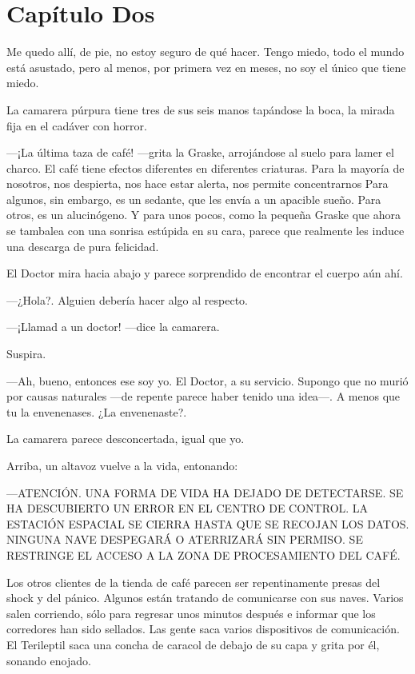 \chapter*{Capítulo Dos}


Me quedo allí, de pie, no estoy seguro de qué hacer. Tengo miedo, todo
el mundo está asustado, pero al menos, por primera vez en meses, no soy
el único que tiene miedo.

La camarera púrpura tiene tres de sus seis manos tapándose la boca, la
mirada fija en el cadáver con horror.

---¡La última taza de café! ---grita la Graske, arrojándose al suelo
para lamer el charco. El café tiene efectos diferentes en diferentes
criaturas. Para la mayoría de nosotros, nos despierta, nos hace estar
alerta, nos permite concentrarnos Para algunos, sin embargo, es un
sedante, que les envía a un apacible sueño. Para otros, es un
alucinógeno. Y para unos pocos, como la pequeña Graske que ahora se
tambalea con una sonrisa estúpida en su cara, parece que realmente les
induce una descarga de pura felicidad.

El Doctor mira hacia abajo y parece sorprendido de encontrar el cuerpo
aún ahí. 

---¿Hola?. Alguien debería hacer algo al respecto.

---¡Llamad a un doctor! ---dice la camarera.

Suspira. 

---Ah, bueno, entonces ese soy yo. El Doctor, a su servicio. Supongo que
no murió por causas naturales ---de repente parece haber tenido una
idea---. A menos que tu la envenenases. ¿La envenenaste?.

La camarera parece desconcertada, igual que yo.

Arriba, un altavoz vuelve a la vida, entonando:

---ATENCIÓN. UNA FORMA DE VIDA HA DEJADO DE DETECTARSE. SE HA
DESCUBIERTO UN ERROR EN EL CENTRO DE CONTROL. LA ESTACIÓN ESPACIAL SE
CIERRA HASTA QUE SE RECOJAN LOS DATOS. NINGUNA NAVE DESPEGARÁ O
ATERRIZARÁ SIN PERMISO. SE RESTRINGE EL ACCESO A LA ZONA DE
PROCESAMIENTO DEL CAFÉ.

Los otros clientes de la tienda de café parecen ser repentinamente
presas del shock y del pánico. Algunos están tratando de comunicarse con
sus naves. Varios salen corriendo, sólo para regresar unos minutos
después e informar que los corredores han sido sellados. Las gente saca
varios dispositivos de comunicación. El Terileptil saca una concha de
caracol de debajo de su capa y grita por él, sonando enojado.

